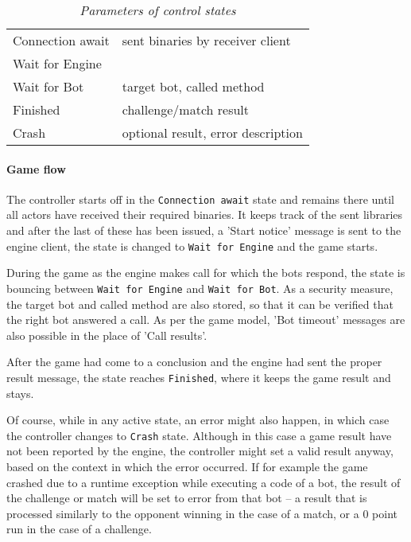 \documentclass[11pt,a4paper,oneside]{report}
\newcommand{\code}{\texttt}
\newcommand*{\xdash}[1][5em]{\rule[0.5ex]{#1}{0.55pt}}
\def\emptycell{\multicolumn{1}{c|}{\xdash}}
\begin{document}
		\begin{table}[h]
			\centering
			\setlength{\tabcolsep}{8pt}
			\renewcommand{\arraystretch}{1.5}
			\begin{tabularx}{0.8\linewidth}{
				|>{\hsize=0.7\hsize}X|%
				>{\hsize1.3\hsize}X|%
			  }
				\hline
				 \multicolumn{1}{|c|}{\textbf{Control state}} &%
				 \multicolumn{1}{c|}{\textbf{Parameters}} \\ \hline
				
				Connection await & sent binaries by receiver client \\ \hline
				Wait for Engine & \emptycell \\ \hline
				Wait for Bot & target bot, called method \\ \hline
				Finished & challenge/match result \\ \hline
				Crash & optional result, error description \\ \hline
			\end{tabularx}
			\caption*{\emph{Parameters of control states}}
		\end{table}

			\paragraph{Game flow}
			
			The controller starts off in the \code{Connection await} state and remains there until all actors have received their required binaries. It keeps track of the sent libraries and after the last of these has been issued, a 'Start notice' message is sent to the engine client, the state is changed to \code{Wait for Engine} and the game starts.
			
			During the game as the engine makes call for which the bots respond, the state is bouncing between \code{Wait for Engine} and \code{Wait for Bot}. As a security measure, the target bot and called method are also stored, so that it can be verified that the right bot answered a call. As per the game model, 'Bot timeout' messages are also possible in the place of 'Call results'.
			
			After the game had come to a conclusion and the engine had sent the proper result message, the state reaches \code{Finished}, where it keeps the game result and stays.
			
			Of course, while in any active state, an error might also happen, in which case the controller changes to \code{Crash} state. Although in this case a game result have not been reported by the engine, the controller might set a valid result anyway, based on the context in which the error occurred. If for example the game crashed due to a runtime exception while executing a code of a bot, the result of the challenge or match will be set to error from that bot -- a result that is processed similarly to the opponent winning in the case of a match, or a 0 point run in the case of a challenge.
\end{document}
